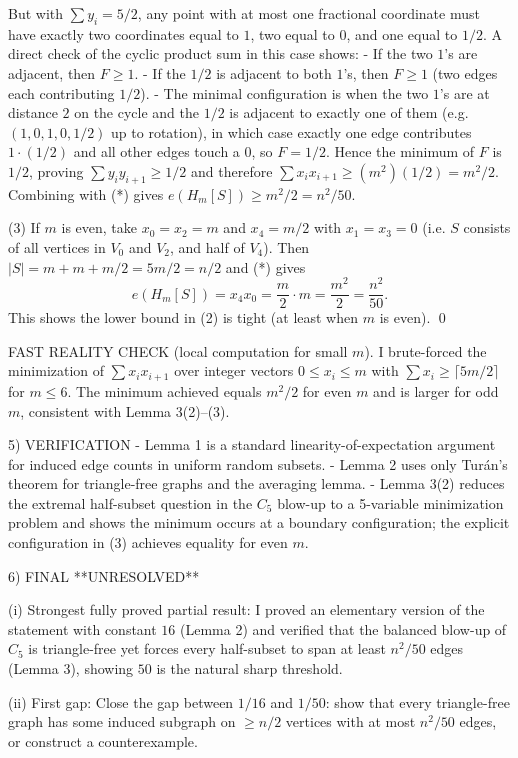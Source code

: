 But with $\sum y_i=5/2$, any point with at most one fractional coordinate must have exactly two coordinates equal to $1$, two equal to $0$, and one equal to $1/2$.
A direct check of the cyclic product sum in this case shows:
- If the two $1$'s are adjacent, then $F\ge 1$.
- If the $1/2$ is adjacent to both $1$'s, then $F\ge 1$ (two edges each contributing $1/2$).
- The minimal configuration is when the two $1$'s are at distance $2$ on the cycle and the $1/2$ is adjacent to exactly one of them (e.g. $(1,0,1,0,1/2)$ up to rotation),
  in which case exactly one edge contributes $1\cdot(1/2)$ and all other edges touch a $0$, so $F=1/2$.
Hence the minimum of $F$ is $1/2$, proving $\sum y_i y_{i+1}\ge 1/2$ and therefore $\sum x_i x_{i+1}\ge (m^2)(1/2)=m^2/2$.
Combining with (*) gives $e(H_m[S])\ge m^2/2=n^2/50$.

(3) If $m$ is even, take $x_0=x_2=m$ and $x_4=m/2$ with $x_1=x_3=0$ (i.e. $S$ consists of all vertices in $V_0$ and $V_2$, and half of $V_4$).
Then $|S|=m+m+m/2=5m/2=n/2$ and (*) gives
\[e(H_m[S])=x_4x_0=\frac{m}{2}\cdot m=\frac{m^2}{2}=\frac{n^2}{50}.\]
This shows the lower bound in (2) is tight (at least when $m$ is even). \qed

FAST REALITY CHECK (local computation for small $m$).
I brute-forced the minimization of $\sum x_i x_{i+1}$ over integer vectors $0\le x_i\le m$ with $\sum x_i\ge \lceil 5m/2\rceil$ for $m\le 6$.
The minimum achieved equals $m^2/2$ for even $m$ and is larger for odd $m$, consistent with Lemma 3(2)--(3).

5) VERIFICATION
- Lemma 1 is a standard linearity-of-expectation argument for induced edge counts in uniform random subsets.
- Lemma 2 uses only Tur\'an's theorem for triangle-free graphs and the averaging lemma.
- Lemma 3(2) reduces the extremal half-subset question in the $C_5$ blow-up to a 5-variable minimization problem and shows the minimum occurs at a boundary configuration; the explicit configuration in (3) achieves equality for even $m$.

6) FINAL
**UNRESOLVED**

(i) Strongest fully proved partial result:
I proved an elementary version of the statement with constant $16$ (Lemma 2) and verified that the balanced blow-up of $C_5$ is triangle-free yet forces every half-subset to span at least $n^2/50$ edges (Lemma 3), showing $50$ is the natural sharp threshold.

(ii) First gap:
Close the gap between $1/16$ and $1/50$: show that every triangle-free graph has some induced subgraph on $\ge n/2$ vertices with at most $n^2/50$ edges, or construct a counterexample.

